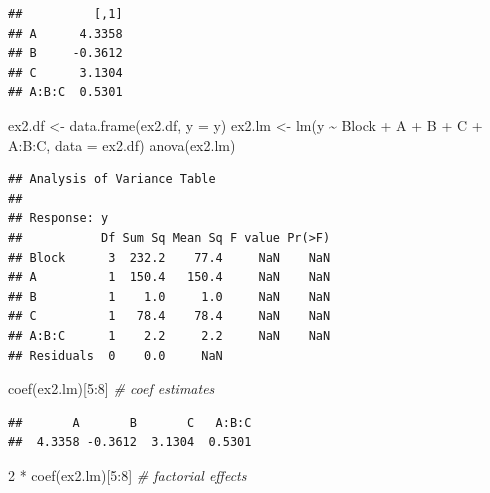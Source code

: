 \documentclass[
]{book}
\newenvironment{Shaded}{\begin{snugshade}}{\end{snugshade}}
\newcommand{\AttributeTok}[1]{\textcolor[rgb]{0.77,0.63,0.00}{#1}}
\newcommand{\CommentTok}[1]{\textcolor[rgb]{0.56,0.35,0.01}{\textit{#1}}}
\newcommand{\DecValTok}[1]{\textcolor[rgb]{0.00,0.00,0.81}{#1}}
\newcommand{\FunctionTok}[1]{\textcolor[rgb]{0.00,0.00,0.00}{#1}}
\newcommand{\NormalTok}[1]{#1}
\newcommand{\OtherTok}[1]{\textcolor[rgb]{0.56,0.35,0.01}{#1}}
\newcommand{\SpecialCharTok}[1]{\textcolor[rgb]{0.00,0.00,0.00}{#1}}
\theoremstyle{definition}
\theoremstyle{definition}
\theoremstyle{definition}
\theoremstyle{definition}
\theoremstyle{remark}
\begin{document}
\begin{verbatim}
##          [,1]
## A      4.3358
## B     -0.3612
## C      3.1304
## A:B:C  0.5301
\end{verbatim}

\begin{Shaded}
\begin{Highlighting}[]
\NormalTok{ex2.df }\OtherTok{\textless{}{-}} \FunctionTok{data.frame}\NormalTok{(ex2.df, }\AttributeTok{y =}\NormalTok{ y)}
\NormalTok{ex2.lm }\OtherTok{\textless{}{-}} \FunctionTok{lm}\NormalTok{(y }\SpecialCharTok{\textasciitilde{}}\NormalTok{  Block }\SpecialCharTok{+}\NormalTok{ A }\SpecialCharTok{+}\NormalTok{ B }\SpecialCharTok{+}\NormalTok{ C }\SpecialCharTok{+}\NormalTok{ A}\SpecialCharTok{:}\NormalTok{B}\SpecialCharTok{:}\NormalTok{C, }\AttributeTok{data =}\NormalTok{ ex2.df)}
\FunctionTok{anova}\NormalTok{(ex2.lm)}
\end{Highlighting}
\end{Shaded}

\begin{verbatim}
## Analysis of Variance Table
## 
## Response: y
##           Df Sum Sq Mean Sq F value Pr(>F)
## Block      3  232.2    77.4     NaN    NaN
## A          1  150.4   150.4     NaN    NaN
## B          1    1.0     1.0     NaN    NaN
## C          1   78.4    78.4     NaN    NaN
## A:B:C      1    2.2     2.2     NaN    NaN
## Residuals  0    0.0     NaN
\end{verbatim}

\begin{Shaded}
\begin{Highlighting}[]
\FunctionTok{coef}\NormalTok{(ex2.lm)[}\DecValTok{5}\SpecialCharTok{:}\DecValTok{8}\NormalTok{] }\CommentTok{\# coef estimates}
\end{Highlighting}
\end{Shaded}

\begin{verbatim}
##       A       B       C   A:B:C 
##  4.3358 -0.3612  3.1304  0.5301
\end{verbatim}

\begin{Shaded}
\begin{Highlighting}[]
\DecValTok{2} \SpecialCharTok{*} \FunctionTok{coef}\NormalTok{(ex2.lm)[}\DecValTok{5}\SpecialCharTok{:}\DecValTok{8}\NormalTok{] }\CommentTok{\# factorial effects}
\end{Highlighting}
\end{Shaded}
\end{document}
